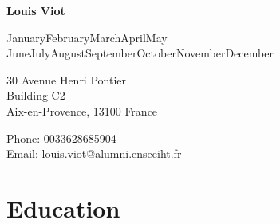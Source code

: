 \documentclass{article}
\def\name{Louis Viot}
\renewcommand{\today}{\ifcase \month \or January\or February\or March\or April\or May \or June\or July\or August\or September\or October\or November\or December\fi \space \the\year}
\begin{document}
{\huge \bf \name}

\bigskip
\today

\bigskip
\begin{minipage}[t]{0.495\textwidth}
	30 Avenue Henri Pontier \\
    Building C2 \\
    Aix-en-Provence, 13100 France
\end{minipage}
\begin{minipage}[t]{0.495\textwidth}
  Phone: 0033628685904 \\
  Email: \href{mailto:louis.viot@alumni.enseeiht.fr}{louis.viot@alumni.enseeiht.fr} \\
\end{minipage}

\section*{Education}
\end{document}
